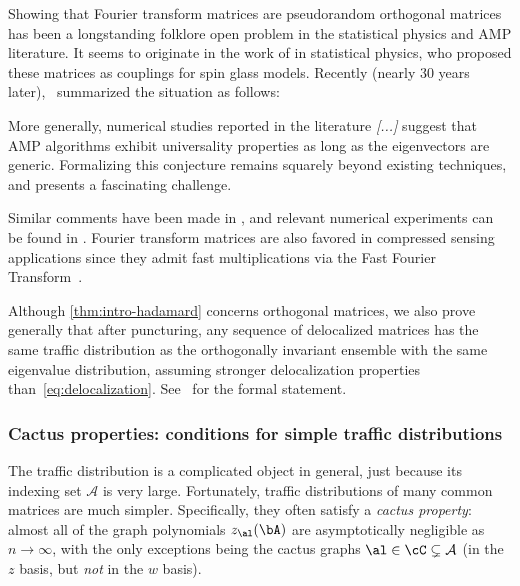 Showing that Fourier transform matrices are pseudorandom orthogonal matrices has been a longstanding folklore open problem
in the statistical physics and AMP literature.
It seems to originate in the work of \cite{marinari1994replicaI,marinari1994replicaII,parisi1995mean} in statistical physics, who proposed these matrices as couplings for spin glass models.
Recently (nearly 30 years later),~\cite{dudeja2023universality}
summarized the situation as follows:
\begin{displayquote}
    More generally, numerical studies reported in the literature \emph{[...]}
    suggest that AMP algorithms exhibit universality properties as long as the
    eigenvectors are generic. Formalizing this conjecture remains squarely beyond
    existing techniques, and presents a fascinating challenge.
\end{displayquote}
Similar comments have been made in \cite{subsamplingJavanmard,rangan2019convergence,barbierSpatial}, and relevant numerical experiments can be found in \cite{CO-2019-TAPEquationAMPInvariant,abbara2020universality,dudeja2023universality}. 
Fourier transform matrices are also
favored in compressed sensing applications since they admit fast
multiplications via the Fast Fourier Transform~\cite[Example 2.26]{wang2022universality}.

Although \cref{thm:intro-hadamard} concerns orthogonal 
matrices, we also prove generally that after puncturing, any sequence of delocalized matrices has the same traffic distribution as the orthogonally invariant ensemble with the same eigenvalue distribution, assuming stronger delocalization properties than~\cref{eq:delocalization}. See~ for the formal statement.

\subsubsection{Cactus properties: conditions for simple traffic distributions}

The traffic distribution is a complicated object in general, just because its indexing set $\mathcal{A}$ is very large.
Fortunately, traffic distributions of many common matrices are much simpler.
Specifically, they often satisfy a \emph{cactus property}:
almost all of the graph polynomials $z_\al(\bA)$ are asymptotically negligible as $n \to \infty$, with the only exceptions being the cactus graphs $\al \in \cC \subsetneq \mathcal{A}$ (in the $z$ basis, but \emph{not} in the $w$ basis).

